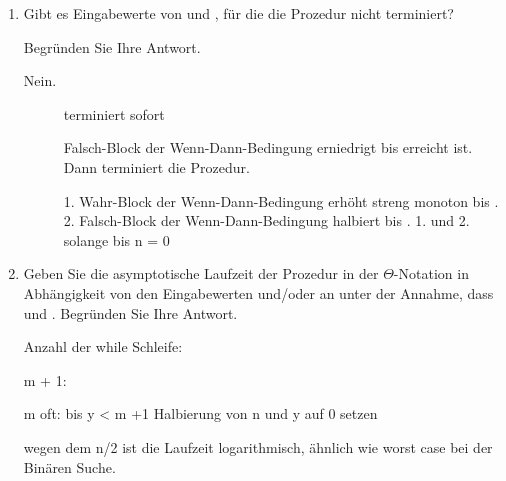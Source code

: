 \documentclass{lehramt-informatik-aufgabe}
\begin{document}
\begin{enumerate}

\item Gibt es Eingabewerte von  und , für die die Prozedur
 nicht terminiert?

Begründen Sie Ihre Antwort.

\begin{liAntwort}
Nein.

\begin{description}
\item[]

terminiert sofort

\item[]

Falsch-Block der Wenn-Dann-Bedingung erniedrigt   bis  erreicht
ist. Dann terminiert die Prozedur.

\item[]

1. Wahr-Block der Wenn-Dann-Bedingung erhöht  streng monoton bis
. 2. Falsch-Block der Wenn-Dann-Bedingung halbiert  bis
. 1. und 2. solange bis n = 0

\end{description}
\end{liAntwort}


\item Geben Sie die asymptotische Laufzeit der Prozedur  in
der $\Theta$-Notation in Abhängigkeit von den Eingabewerten 
und/oder  an unter der Annahme, dass  und .
Begründen Sie Ihre Antwort.

\begin{liAntwort}

Anzahl der while Schleife:

m + 1:

m oft: bis y < m
+1 Halbierung von n und y auf 0 setzen

wegen dem n/2 ist die Laufzeit logarithmisch, ähnlich wie worst case bei
der Binären Suche.


\end{liAntwort}
\end{enumerate}
\end{document}
